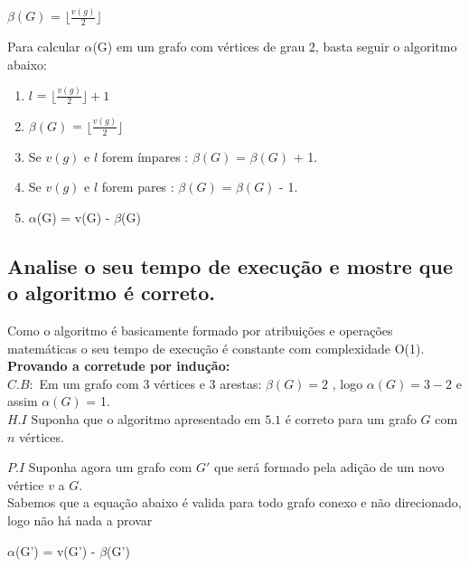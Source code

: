 \documentclass[12pt]{article}
\begin{document}
\begin{center}
    $\beta(G)$ =  $\lfloor\frac{v(g)}{2}\rfloor$
\end{center}


Para calcular $\alpha$(G) em um grafo com vértices de grau 2, basta seguir o algoritmo abaixo: \\


\begin{enumerate}
    \item $l$ = $\lfloor\frac{v(g)}{2}\rfloor + 1 $
    \item $\beta(G)$ = $\lfloor\frac{v(g)}{2}\rfloor$
    \item Se $v(g)$ e $l$ forem ímpares : $\beta(G)$  = $\beta(G)$ + 1.
    \item Se $v(g)$ e $l$ forem pares : $\beta(G)$  = $\beta(G)$ - 1.
    \item $\alpha$(G) = v(G) - $\beta$(G)
\end{enumerate}



\subsection{Analise o seu tempo de execução e mostre que o algoritmo é correto.}
Como o algoritmo é basicamente formado por atribuições e operações matemáticas o seu tempo de execução é constante com complexidade O(1).\\

\textbf{Provando a corretude por indução:}\\

$C.B:$ Em um grafo com 3 vértices e 3 arestas: $\beta(G) = 2$ , logo $\alpha(G) = 3 - 2$ e assim $\alpha(G)$ = 1. \\

$H.I$ Suponha que o algoritmo apresentado em $5.1$ é correto para um grafo $G$ com $n$ vértices.

$P.I$ Suponha agora um grafo com $G'$ que será formado pela adição de um novo vértice $v$ a $G$.\\


Sabemos que a equação abaixo é valida para todo grafo conexo e não direcionado, logo não há nada a provar
\begin{center}
    $\alpha$(G') = v(G') - $\beta$(G')
\end{center}
\end{document}
